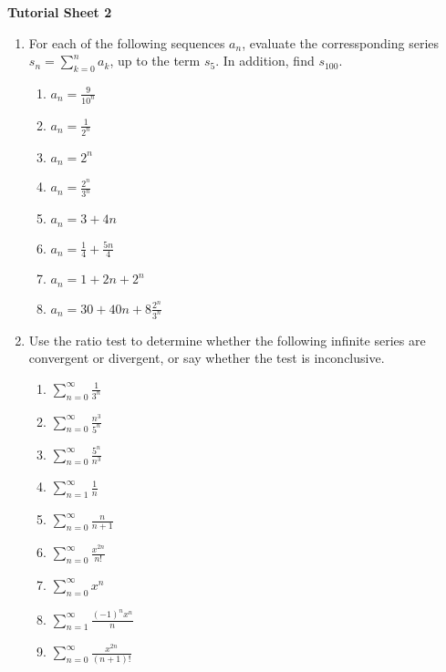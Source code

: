 \documentclass[11pt,a4paper,titlepage,oneside,openany]{article}
\numberwithin{equation}{section}
\numberwithin{algorithm}{section}
\numberwithin{figure}{section}
\numberwithin{table}{section}
\begin{document}
\begin{center}
  \textbf{Tutorial Sheet 2}
\end{center}

\begin{enumerate}
\item For each of the following sequences $a_n$, evaluate the corressponding series $s_n=\displaystyle\sum_{k=0}^n a_k$, up to the term $s_5$. In addition, find $s_{100}$.  
  \begin{multicols}{2}
    \begin{enumerate}
    \item $a_n=\frac{9}{10^n}$
    \item $a_n=\frac{1}{2^n}$
    \item $a_n=2^n$
    \item $a_n=\frac{2^n}{3^n}$
    \item $a_n=3+4n$
    \item $a_n=\frac{1}{4}+\frac{5n}{4}$
    \item $a_n=1+2n+2^n$
    \item $a_n=30+40n+8\frac{2^n}{3^n}$
    \end{enumerate}        
  \end{multicols}
\item Use the ratio test to determine whether the following infinite series are convergent or divergent, or say whether the test is inconclusive.
\begin{multicols}{3}
    \begin{enumerate}
    \item $\displaystyle \sum_{n=0}^\infty \frac{1}{3^n}$
    \item $\displaystyle \sum_{n=0}^\infty \frac{n^3}{5^n}$
    \item $\displaystyle \sum_{n=0}^\infty \frac{5^n}{n^3}$
    \item $\displaystyle \sum_{n=1}^\infty \frac{1}{n}$
    \item $\displaystyle \sum_{n=0}^\infty \frac{n}{n+1}$
    \item $\displaystyle \sum_{n=0}^\infty \frac{x^{2n}}{n!}$
    \item $\displaystyle \sum_{n=0}^\infty x^n$
    \item $\displaystyle \sum_{n=1}^\infty \frac{(-1)^n x^n}{n}$
    \item $\displaystyle \sum_{n=0}^\infty \frac{x^{2n}}{(n+1)!}$
    \end{enumerate}        
  \end{multicols}



\end{enumerate}
\end{document}
